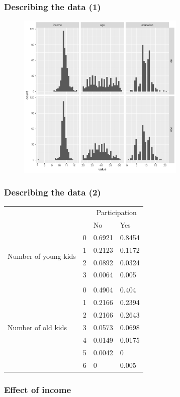 \documentclass{beamer}
\newcommand{\1}{\mathbb{1}}
\begin{document}
\begin{frame}\frametitle{Describing the data (1)}
\begin{figure}
\includegraphics[width = 8cm]{char}
\end{figure}
\end{frame}

\begin{frame}\frametitle{Describing the data (2)}
\begin{table}[ht]
\centering
\begin{tabular}{llll}
  \toprule 
 &  &  \multicolumn{2}{c}{Participation} \\ 
 &  & No  & Yes \\ 
 \multirow{4}{*}{Number of young kids} & 0 & 0.6921 & 0.8454 \\ 
     & 1 & 0.2123 & 0.1172 \\ 
     & 2 & 0.0892 & 0.0324 \\ 
     & 3 & 0.0064 & 0.005 \\ \\
  \multirow{7}{*}{Number of old kids} & 0 & 0.4904 & 0.404 \\ 
     & 1 & 0.2166 & 0.2394 \\ 
     & 2 & 0.2166 & 0.2643 \\ 
     & 3 & 0.0573 & 0.0698 \\ 
     & 4 & 0.0149 & 0.0175 \\ 
     & 5 & 0.0042 & 0 \\ 
     & 6 & 0 & 0.005 \\ 
   \bottomrule 
\end{tabular}
\end{table}
\end{frame}


\begin{frame}\frametitle{Effect of income}

\end{frame}
\end{document}
